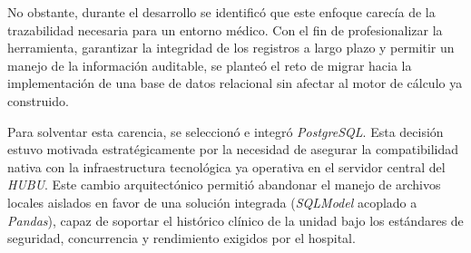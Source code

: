 No obstante, durante el desarrollo se identificó que este enfoque carecía de la trazabilidad necesaria para un entorno médico. Con el fin de profesionalizar la herramienta, garantizar la integridad de los registros a largo plazo y permitir un manejo de la información auditable, se planteó el reto de migrar hacia la implementación de una base de datos relacional sin afectar al motor de cálculo ya construido. 

Para solventar esta carencia, se seleccionó e integró \textit{PostgreSQL}. Esta decisión estuvo motivada estratégicamente por la necesidad de asegurar la compatibilidad nativa con la infraestructura tecnológica ya operativa en el servidor central del \textit{HUBU}. Este cambio arquitectónico permitió abandonar el manejo de archivos locales aislados en favor de una solución integrada (\textit{SQLModel} acoplado a \textit{Pandas}), capaz de soportar el histórico clínico de la unidad bajo los estándares de seguridad, concurrencia y rendimiento exigidos por el hospital.

